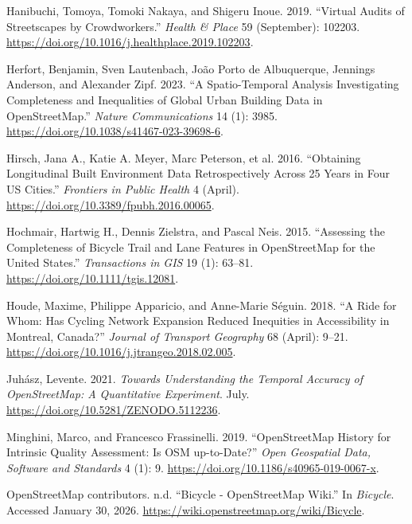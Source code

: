 \documentclass[
]{article}
\newlength{\cslhangindent}
\newenvironment{CSLReferences}[2] %
 {\begin{list}{}{%
  \setlength{\itemindent}{0pt}
  \setlength{\leftmargin}{0pt}
  \setlength{\parsep}{0pt}
  \ifodd #1
   \setlength{\leftmargin}{\cslhangindent}
   \setlength{\itemindent}{-1\cslhangindent}
  \fi
  \setlength{\itemsep}{#2\baselineskip}}}
 {\end{list}}
\begin{document}
\begin{CSLReferences}{1}{1}
Hanibuchi, Tomoya, Tomoki Nakaya, and Shigeru Inoue. 2019. {``Virtual
Audits of Streetscapes by Crowdworkers.''} \emph{Health \& Place} 59
(September): 102203.
\url{https://doi.org/10.1016/j.healthplace.2019.102203}.

Herfort, Benjamin, Sven Lautenbach, João Porto de Albuquerque, Jennings
Anderson, and Alexander Zipf. 2023. {``A Spatio-Temporal Analysis
Investigating Completeness and Inequalities of Global Urban Building
Data in {OpenStreetMap}.''} \emph{Nature Communications} 14 (1): 3985.
\url{https://doi.org/10.1038/s41467-023-39698-6}.

Hirsch, Jana A., Katie A. Meyer, Marc Peterson, et al. 2016.
{``Obtaining {Longitudinal} {Built} {Environment} {Data}
{Retrospectively} Across 25 Years in {Four} {US} {Cities}.''}
\emph{Frontiers in Public Health} 4 (April).
\url{https://doi.org/10.3389/fpubh.2016.00065}.

Hochmair, Hartwig H., Dennis Zielstra, and Pascal Neis. 2015.
{``Assessing the {Completeness} of {Bicycle} {Trail} and {Lane}
{Features} in {OpenStreetMap} for the {United} {States}.''}
\emph{Transactions in GIS} 19 (1): 63--81.
\url{https://doi.org/10.1111/tgis.12081}.

Houde, Maxime, Philippe Apparicio, and Anne-Marie Séguin. 2018. {``A
Ride for Whom: {Has} Cycling Network Expansion Reduced Inequities in
Accessibility in {Montreal}, {Canada}?''} \emph{Journal of Transport
Geography} 68 (April): 9--21.
\url{https://doi.org/10.1016/j.jtrangeo.2018.02.005}.

Juhász, Levente. 2021. \emph{Towards Understanding the Temporal Accuracy
of {OpenStreetMap}: {A} Quantitative Experiment}. July.
\url{https://doi.org/10.5281/ZENODO.5112236}.

Minghini, Marco, and Francesco Frassinelli. 2019. {``{OpenStreetMap}
History for Intrinsic Quality Assessment: {Is} {OSM} up-to-Date?''}
\emph{Open Geospatial Data, Software and Standards} 4 (1): 9.
\url{https://doi.org/10.1186/s40965-019-0067-x}.

OpenStreetMap contributors. n.d. {``Bicycle - {OpenStreetMap} {Wiki}.''}
In \emph{Bicycle}. Accessed January 30, 2026.
\url{https://wiki.openstreetmap.org/wiki/Bicycle}.


\end{CSLReferences}
\end{document}
